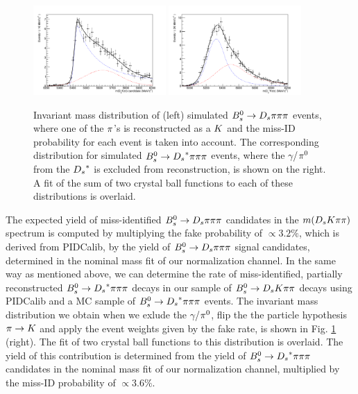 \begin{figure}[h]
\includegraphics[height=6.cm,width=0.45\textwidth]{figs/Bs2Dspipipi_as_DsKpipi.pdf}
\includegraphics[height=6.cm,width=0.45\textwidth]{figs/Bs2Dsstarpipipi_as_DsKpipi.pdf}
\caption{Invariant mass distribution of (left) simulated ${{B}^0_{s}}\rightarrow{\ensuremath{{D}_{s}}}{\ensuremath{\pi}}{\ensuremath{\pi}}{\ensuremath{\pi}}$ events, where one of the ${\pi}$'s is reconstructed as a ${K}$ and the miss-ID probability for each event is taken into account. 
The corresponding distribution for simulated ${{B}^0_{s}}\rightarrow{\ensuremath{{D}_{s}}}^{*}{\pi}{\pi}{\pi}$ events, where the $\gamma$/${{\pi}^0}$ from the ${{D}_{s}}^{*}$ is excluded from reconstruction, is shown on the right.
A fit of the sum of two crystal ball functions to each of these distributions is overlaid.}
\label{fig: BsDspipipiMCmissID}
\end{figure}
 
The expected yield of miss-identified ${{B}^0_{s}}\rightarrow{\ensuremath{{D}_{s}}}{\ensuremath{\pi}}{\ensuremath{\pi}}{\ensuremath{\pi}}$ candidates in the $m({{D}_{s}}{K}{\pi}{\pi})$ spectrum is computed by multiplying the fake probability of $\propto3.2\%$, which is derived from PIDCalib, by the yield of ${{B}^0_{s}}\rightarrow{\ensuremath{{D}_{s}}}{\ensuremath{\pi}}{\ensuremath{\pi}}{\ensuremath{\pi}}$ signal candidates, determined in the nominal mass fit of our normalization channel.  \newline
In the same way as mentioned above, we can determine the rate of miss-identified, partially reconstructed ${{B}^0_{s}}\rightarrow{\ensuremath{{D}_{s}}}^{*}{\pi}{\pi}{\pi}$ decays in our sample of ${{B}^0_{s}}\rightarrow{\ensuremath{{D}_{s}}}{\ensuremath{K}}{\ensuremath{\pi}}{\ensuremath{\pi}}$ decays using PIDCalib and a MC sample of ${{B}^0_{s}}\rightarrow{\ensuremath{{D}_{s}}}^{*}{\pi}{\pi}{\pi}$ events. The invariant mass distribution we obtain when we exlude the $\gamma$/${{\pi}^0}$, flip the the particle hypothesis ${\pi}\rightarrow{\ensuremath{K}}$ and apply the event weights given by the fake rate, is shown in Fig. \ref{fig: BsDspipipiMCmissID} (right). The fit of two crystal ball functions to this distribution is overlaid. 
The yield of this contribution is determined from the yield of ${{B}^0_{s}}\rightarrow{\ensuremath{{D}_{s}}}^{*}{\pi}{\pi}{\pi}$ candidates in the nominal mass fit of our normalization channel, multiplied by the miss-ID probability of $\propto 3.6\%$.

